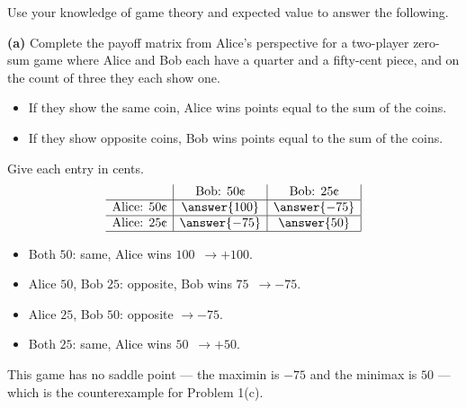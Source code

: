 \documentclass[12pt]{ximera}
\begin{document}
\begin{problem}
Use your knowledge of game theory and expected value to answer the following.

\begin{prompt}
\textbf{(a)} Complete the payoff matrix from Alice's perspective for a two-player
zero-sum game where Alice and Bob each have a quarter and a fifty-cent piece, and on the
count of three they each show one.
\begin{itemize}
\item If they show the same coin, Alice wins points equal to the sum of the coins.
\item If they show opposite coins, Bob wins points equal to the sum of the coins.
\end{itemize}

Give each entry in cents.
\[
\begin{array}{c|c|c|}
\phantom{|} & \text{Bob: }50\text{\textcent} & \text{Bob: }25\text{\textcent} \\\hline
\text{Alice: }50\text{\textcent} & \answer{100} & \answer{-75} \\\hline
\text{Alice: }25\text{\textcent} & \answer{-75} & \answer{50} \\\hline
\end{array}
\]

\begin{feedback}
\begin{itemize}
\item Both $50$\textcent: same, Alice wins $100$\textcent\ $\to +100$.
\item Alice $50$\textcent, Bob $25$\textcent: opposite, Bob wins $75$\textcent\ $\to -75$.
\item Alice $25$\textcent, Bob $50$\textcent: opposite $\to -75$.
\item Both $25$\textcent: same, Alice wins $50$\textcent\ $\to +50$.
\end{itemize}
This game has no saddle point --- the maximin is $-75$ and the minimax is $50$ --- which
is the counterexample for Problem 1(c).
\end{feedback}
\end{prompt}

\end{problem}
\end{document}
